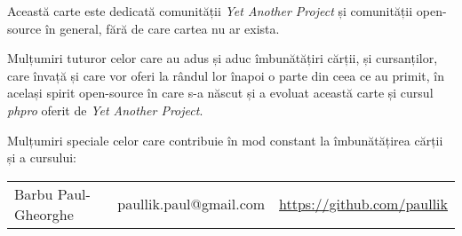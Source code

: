 \begin{dedication}

Această carte este dedicată comunității \textit{Yet Another Project} și
comunității open-source în general, fără de care cartea nu ar exista.

Mulțumiri tuturor celor care au adus și aduc îmbunătățiri cărții, și cursanților,
care învață și care vor oferi la rândul lor înapoi o parte din ceea ce au
primit, în același spirit open-source în care s-a născut și a evoluat această
carte și cursul \textsl{phpro} oferit de \textit{Yet Another Project}.

\vspace{5em}

Mulțumiri speciale celor care contribuie în mod constant la îmbunătățirea
cărții și a cursului:

\vspace{2em}

\begin{tabular}{ l l l }
Barbu Paul-Gheorghe & paullik.paul@gmail.com & \url{https://github.com/paullik}
\end{tabular}

\end{dedication}
